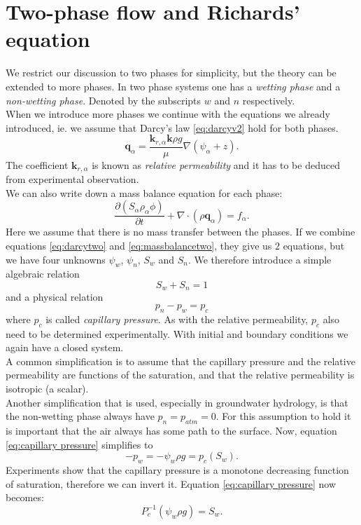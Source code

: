 \documentclass[../Main/main.tex]{subfiles}
\begin{document}
\section*{Two-phase flow and Richards' equation}
We restrict our discussion to two phases for simplicity, but the theory can be extended to more phases. In two phase systems one has a \emph{wetting phase} and a \emph{non-wetting phase}. Denoted by the subscripts $w$ and $n$ respectively. \\
When we introduce more phases we continue with the equations we already introduced, ie. we assume that Darcy's law  \eqref{eq:darcyv2} hold for both phases.
\begin{equation}\label{eq:darcytwo}
	\pmb{q}_{\alpha} = \frac{\pmb{k}_{r,\alpha}\pmb{k}\rho g}{\mu}\nabla(\psi_{\alpha} + z).
\end{equation}
The coefficient $\pmb{k}_{r,\alpha}$ is known as \emph{relative permeability} and it has to be deduced from experimental observation. \\ We can also write down a mass balance equation for each phase:
\begin{equation}\label{eq:massbalancetwo}
	\frac{\partial (S_{\alpha}\rho_{\alpha} \phi) }{\partial t} + \nabla \cdot (\rho \pmb{q}_{\alpha}) = f_{\alpha}.
\end{equation}
Here we assume that there is no mass transfer between the phases.
If we combine equations \eqref{eq:darcytwo} and \eqref{eq:massbalancetwo}, they give us $2$ equations, but we have four unknowns $\psi_w$, $\psi_n$, $S_w$ and $S_n$. We therefore introduce a simple algebraic relation
\begin{equation*}
	S_w + S_n = 1
\end{equation*}
and a physical relation
\begin{equation}\label{eq:capillary pressure}
	p_n-p_w = p_c
\end{equation}
where $p_c$ is called \emph{capillary pressure}. As with the relative permeability, $p_c$ also need to be determined experimentally.
With initial and boundary conditions we again have a closed system.\\
A common simplification is to assume that the capillary pressure and the relative permeability are functions of the saturation, and that the relative permeability is isotropic (a scalar). \\
Another simplification that is used, especially in groundwater hydrology, is that the non-wetting phase always have $p_n = p_{atm}=0$. For this assumption to hold it is important that the air always has some path to the surface. Now, equation \eqref{eq:capillary pressure} simplifies to
\begin{equation}\label{eq:groundwater capillary pressure}
	-p_w = -\psi_w\rho g = p_c(S_w).
\end{equation}
Experiments show that the capillary pressure is a monotone decreasing function of saturation, therefore we can invert it. Equation \eqref{eq:capillary pressure} now becomes:
\begin{equation}
	P_c^{-1}(\psi_w\rho g) = S_w.
\end{equation}
\end{document}
